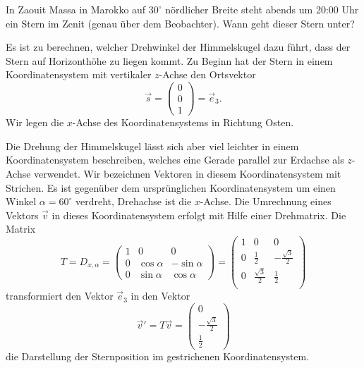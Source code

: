 In Zaouit Massa in Marokko auf $30^\circ$ nördlicher Breite steht abends
um 20:00 Uhr ein Stern im Zenit (genau über dem Beobachter). Wann geht
dieser Stern unter?

\begin{loesung}
Es ist zu berechnen, welcher Drehwinkel der Himmelskugel dazu führt,
dass der Stern auf Horizonthöhe zu liegen kommt. Zu Beginn hat der
Stern in einem Koordinatensystem mit vertikaler $z$-Achse den
Ortsvektor
\[
\vec s=\begin{pmatrix}0\\0\\1\end{pmatrix}=\vec e_3.
\]
Wir legen die $x$-Achse des Koordinatensystems in Richtung Osten.

Die Drehung der Himmelskugel lässt sich aber viel leichter in einem
Koordinatensystem beschreiben, welches eine Gerade parallel zur Erdachse
als $z$-Achse verwendet. Wir bezeichnen Vektoren in diesem Koordinatensystem
mit Strichen. Es ist gegenüber dem ursprünglichen Koordinatensystem
um einen Winkel $\alpha=60^\circ$ verdreht, Drehachse ist die $x$-Achse.
Die Umrechnung eines Vektors $\vec v$ in dieses Koordinatensystem
erfolgt mit Hilfe einer Drehmatrix.
Die Matrix
\[
T=D_{x,\alpha}=\begin{pmatrix}
1&          0&          0\\
0& \cos\alpha&-\sin\alpha\\
0& \sin\alpha& \cos\alpha
\end{pmatrix}
=
\begin{pmatrix}
1& 0&0\\
0&\frac12&-\frac{\sqrt{3}}2\\
0&\frac{\sqrt{3}}2&\frac12\\
\end{pmatrix}
\]
transformiert den Vektor $\vec e_3$ in den Vektor
\[
\vec v'=T\vec v=
\begin{pmatrix}
0\\-\frac{\sqrt{3}}2\\\frac12 
\end{pmatrix}
\]
die Darstellung der Sternposition im gestrichenen Koordinatensystem.


\end{loesung}
